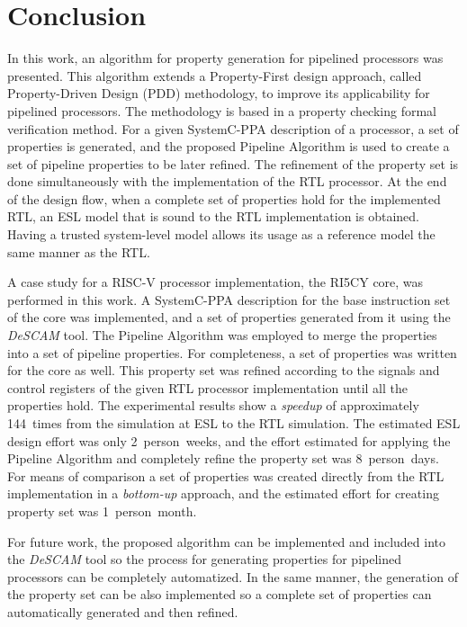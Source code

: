 \chapter{Conclusion}
\label{chapter:conclusion}

In this work, an algorithm for property generation for pipelined processors was presented. This algorithm extends a Property-First design approach, called Property-Driven Design (PDD) methodology, to improve its applicability for pipelined processors. The methodology is based in a property checking formal verification method. For a given SystemC-PPA description of a processor, a set of properties is generated, and the proposed Pipeline Algorithm is used to create a set of pipeline properties to be later refined. The refinement of the property set is done simultaneously with the implementation of the RTL processor. At the end of the design flow, when a complete set of properties hold for the implemented RTL, an ESL model that is sound to the RTL implementation is obtained. Having a trusted system-level model allows its usage as a reference model the same manner as the RTL.

A case study for a RISC-V processor implementation, the RI5CY core, was performed in this work. A SystemC-PPA description for the base instruction set of the core was implemented, and a set of properties generated from it using the \textit{DeSCAM} tool. The Pipeline Algorithm was employed to merge the properties into a set of pipeline properties. For completeness, a set of \SSQED{} properties was written for the core as well. This property set was refined according to the signals and control registers of the given RTL processor implementation until all the properties hold. The experimental results show a \textit{speedup} of approximately 144~times from the simulation at ESL to the RTL simulation. The estimated ESL design effort was only 2~person~weeks, and the effort estimated for applying the Pipeline Algorithm and completely refine the property set was 8~person~days. For means of comparison a set of properties was created directly from the RTL implementation in a \textit{bottom-up} approach, and the estimated effort for creating property set was 1~person~month.

For future work, the proposed algorithm can be implemented and included into the \textit{DeSCAM} tool so the process for generating properties for pipelined processors can be completely automatized. In the same manner, the generation of the \SSQED{} property set can be also implemented so a complete set of properties can automatically generated and then refined.